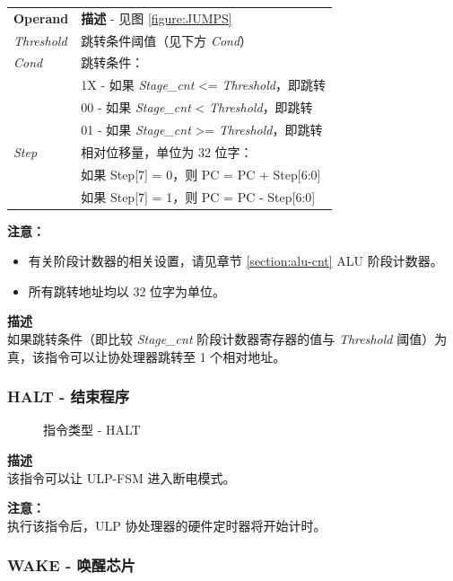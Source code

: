 \documentclass[main\_\_CN.tex]{subfiles}
\begin{document}
\begin{tabular}{ l l }
\textbf{Operand} & \textbf{描述} - 见图 \ref{figure:JUMPS} \\
\textit{Threshold} & 跳转条件阈值（见下方 \textit{Cond}）\\
\textit{Cond} & 跳转条件： \\
 & 1X - 如果 \textit{Stage\_cnt} <= \textit{Threshold}，即跳转 \\
 & 00 - 如果 \textit{Stage\_cnt} < \textit{Threshold}，即跳转 \\
 & 01 - 如果 \textit{Stage\_cnt} >= \textit{Threshold}，即跳转\\
 \textit{Step} & 相对位移量，单位为 32 位字： \\
 & 如果 Step[7] = 0，则 PC = PC + Step[6:0] \\
 & 如果 Step[7] = 1，则 PC = PC - Step[6:0] \\
\end{tabular}


\textbf{注意：}
\begin{itemize}
    \item 有关阶段计数器的相关设置，请见章节 \ref{section:alu-cnt} ALU 阶段计数器。
    \item 所有跳转地址均以 32 位字为单位。
\end{itemize}

\textbf{描述} \\
如果跳转条件（即比较 \textit{Stage\_cnt} 阶段计数器寄存器的值与 \textit{Threshold} 阈值）为真，该指令可以让协处理器跳转至 1 个相对地址。


\subsubsection {HALT - 结束程序} \label{subsection:HALT}

%
%
\begin{figure}[!ht]
    \centering
    \caption{指令类型 - HALT}
    \label{figure:HALT}
\end{figure}

\textbf{描述} \\
该指令可以让 ULP-FSM 进入断电模式。

\textbf{注意：} \\
执行该指令后，ULP 协处理器的硬件定时器将开始计时。


\subsubsection {WAKE - 唤醒芯片}
\end{document}
